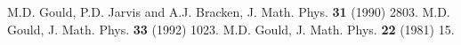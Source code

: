 \documentclass[12pt]{article}
\begin{document}
\begin{thebibliography}{10}
 M.D. Gould, P.D. Jarvis and A.J. Bracken, J. Math. Phys. {\bf 31}
(1990) 2803. 
% 
% 
M.D. Gould, J. Math. Phys. {\bf 33} (1992) 1023.
% 
M.D. Gould, J. Math. Phys. {\bf 22} (1981) 15.

% 
% 
% 
% 
% 
% 
% 
% 
% 
% 
% 
% 
% 
% 
% 
% 
% 
% 
% 
% 
% 
% 
% 
 

\end{thebibliography}
\end{document}
